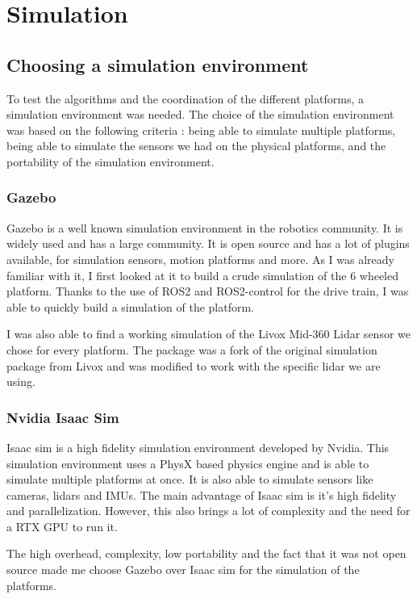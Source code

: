 \documentclass[11pt]{article}
\begin{document}
    \section{Simulation}
        \subsection{Choosing a simulation environment}

            To test the algorithms and the coordination of the different platforms, a simulation environment was needed. The choice of the simulation environment was based on the following criteria : being able to simulate multiple platforms, being able to simulate the sensors we had on the physical platforms, and the portability of the simulation environment.


            \subsubsection{Gazebo}
                Gazebo is a well known simulation environment in the robotics community. It is widely used and has a large community. It is open source and has a lot of plugins available, for simulation sensors, motion platforms and more. As I was already familiar with it, I first looked at it to build a crude simulation of the 6 wheeled platform. Thanks to the use of ROS2 and ROS2-control for the drive train, I was able to quickly build a simulation of the platform. 

                I was also able to find a working simulation of the Livox Mid-360 Lidar sensor we chose for every platform. The package \cite{livox_lidar_simulation_fork} was a fork of the original simulation package from Livox \cite{livox_laser_simulation} and was modified to work with the specific lidar we are using. 
            \subsubsection{Nvidia Isaac Sim}

                Isaac sim is a high fidelity simulation environment developed by Nvidia. This simulation environment uses a PhysX based physics engine and is able to simulate multiple platforms at once. It is also able to simulate sensors like cameras, lidars and IMUs. The main advantage of Isaac sim is it's high fidelity and parallelization. However, this also brings a lot of complexity and the need for a RTX GPU to run it.

                The high overhead, complexity, low portability and the fact that it was not open source made me choose Gazebo over Isaac sim for the simulation of the platforms.
\end{document}

